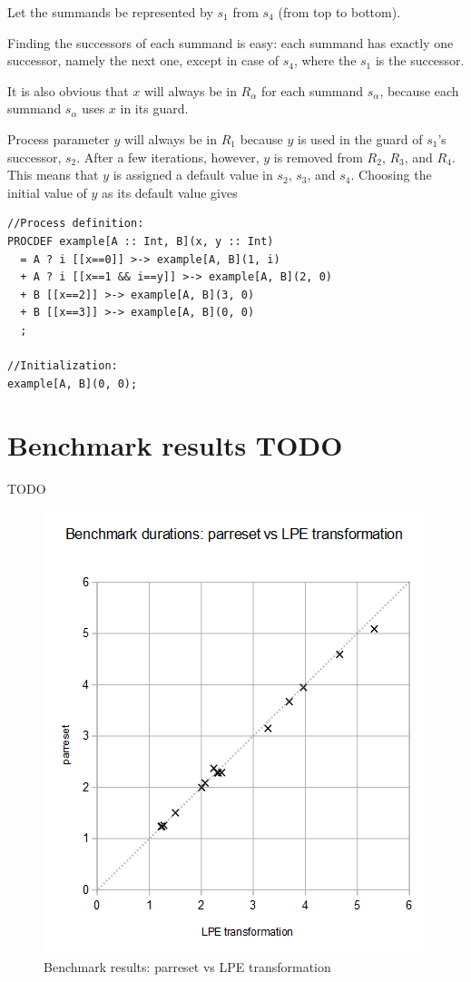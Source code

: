 Let the summands be represented by $s_1$ from $s_4$ (from top to bottom).

Finding the successors of each summand is easy: each summand has exactly one successor, namely the next one, except in case of $s_4$, where the $s_1$ is the successor.

It is also obvious that $x$ will always be in $R_\alpha$ for each summand $s_\alpha$, because each summand $s_\alpha$ uses $x$ in its guard.

Process parameter $y$ will always be in $R_1$ because $y$ is used in the guard of $s_1$'s successor, $s_2$.
After a few iterations, however, $y$ is removed from $R_2$, $R_3$, and $R_4$.
This means that $y$ is assigned a default value in $s_2$, $s_3$, and $s_4$.
Choosing the initial value of $y$ as its default value gives

\begin{lstlisting}
//Process definition:
PROCDEF example[A :: Int, B](x, y :: Int)
  = A ? i [[x==0]] >-> example[A, B](1, i)
  + A ? i [[x==1 && i==y]] >-> example[A, B](2, 0)
  + B [[x==2]] >-> example[A, B](3, 0)
  + B [[x==3]] >-> example[A, B](0, 0)
  ;

//Initialization:
example[A, B](0, 0);
\end{lstlisting}

\section{Benchmark results TODO}

TODO

\begin{figure}[!ht]
\begin{center}
\includegraphics[width=0.7\linewidth]{charts/parreset-vs-lpe-only}
\caption{Benchmark results: parreset vs LPE transformation}
\label{parreset-vs-lpe-only:fig}
\end{center}
\end{figure}


